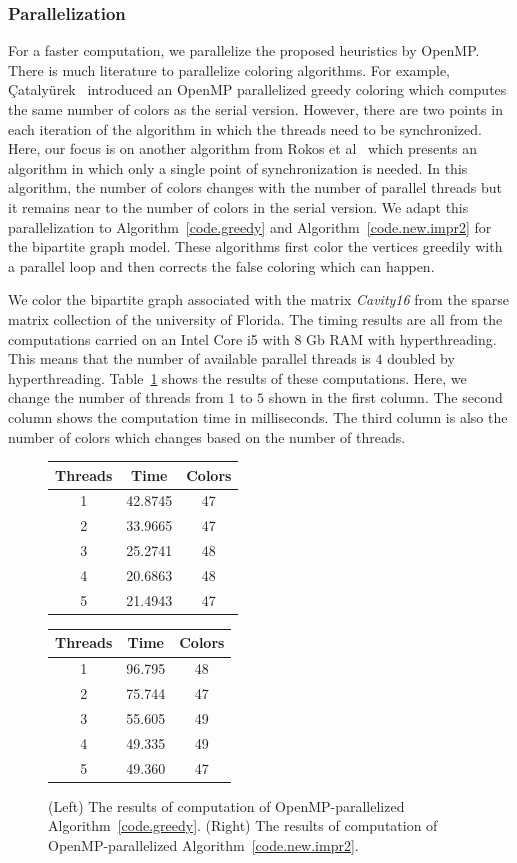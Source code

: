 \documentclass[12pt, twoside,a4paper,toc=bibliography]{scrbook}
\newcommand{\coderef}[1]{Algorithm~\protect\ref{#1}}
\begin{document}
\subsubsection{Parallelization}
\label{s.parallel}
For a faster computation, we parallelize the proposed heuristics by OpenMP.
There is much literature to parallelize coloring algorithms.
For example, {\c{C}}ataly{\"{u}}rek~\cite{cataly2012} introduced an OpenMP parallelized
greedy coloring which computes the same number of colors as the serial version.
However, there are two points in each iteration of the algorithm in which the threads
need to be synchronized.
Here, our focus is on another algorithm from Rokos et al~\cite{Rokos2015}
which presents an algorithm in which only a single point of synchronization is needed.
In this algorithm, the number of colors changes with the number of parallel threads
but it remains near to the number of colors in the serial version.
We adapt this parallelization to \coderef{code.greedy} and \coderef{code.new.impr2} for the bipartite graph model.
These algorithms first color the vertices
greedily with a parallel loop and then corrects the false coloring which can happen.

We color the bipartite graph associated with the matrix \textit{Cavity16}
from the sparse matrix collection of the university of Florida.
The timing results are all from the computations carried on an Intel Core i5 with 8 Gb RAM with hyperthreading.
This means that the number of available parallel threads is $4$ doubled by hyperthreading.
Table~\ref{omp.res} shows the results of these computations.
Here, we change the number of threads from $1$ to $5$ shown in the first column.
The second column shows the computation time in milliseconds. The third column
is also the number of colors which changes based on the number of threads.
\begin{figure}
\begin{tabular}{|c|c|c|}
\hline
Threads & Time & Colors \\\hline
1 & 42.8745 & 47 \\\hline
2 & 33.9665 & 47 \\\hline
3 & 25.2741 & 48 \\\hline
4 & 20.6863 & 48 \\\hline
5 & 21.4943 & 47 \\\hline
\end{tabular}\hfill
\begin{tabular}{|c|c|c|}
\hline
Threads & Time & Colors \\\hline
1 & 96.795 & 48 \\\hline
2 & 75.744 & 47 \\\hline
3 & 55.605 & 49 \\\hline
4 & 49.335 & 49 \\\hline
5 & 49.360 & 47 \\\hline
\end{tabular}
\caption{
(Left) The results of computation of OpenMP-parallelized \coderef{code.greedy}.
(Right) The results of computation of OpenMP-parallelized \coderef{code.new.impr2}.
}
\label{omp.res}
\end{figure}
\end{document}
